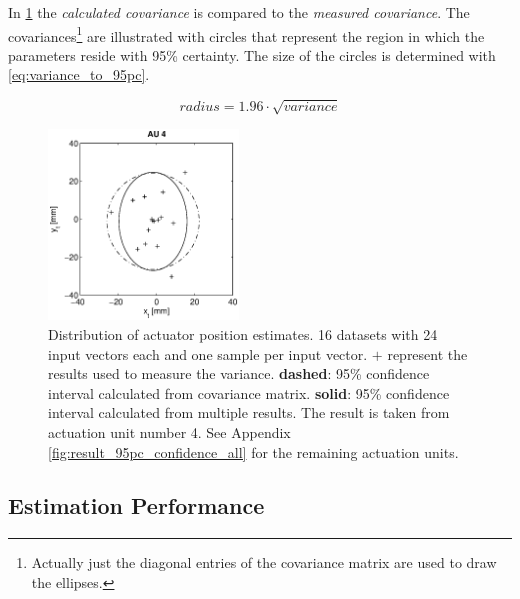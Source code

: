 In \cref{fig:result_95pc_confidence} the \textit{calculated covariance} is compared to the \textit{measured covariance}.
The covariances\footnote{
Actually just the diagonal entries of the covariance matrix are used to draw the ellipses.
}
are illustrated with circles that represent the region in which the parameters reside with 95\% certainty.
The size of the circles is determined with \cref{eq:variance_to_95pc}.

\begin{equation}
\label{eq:variance_to_95pc}
radius = 1.96 \cdot \sqrt{variance}
\end{equation}

\begin{figure}[hbtp]
\captionsetup{width=0.9\textwidth}
\centering
\includegraphics[width = 0.45\textwidth]{images/results/confidence_95_interval_AU4.eps}
\caption{Distribution of actuator position estimates. 16 datasets with 24 input vectors each and one sample per input vector.
$\mathbf{+}$ represent the results used to measure the variance.
\textbf{dashed}: 95\% confidence interval calculated from covariance matrix.
\textbf{solid}: 95\% confidence interval calculated from multiple results. The result is taken from actuation unit number 4. See Appendix \cref{fig:result_95pc_confidence_all} for the remaining actuation units.}
\label{fig:result_95pc_confidence}
\end{figure}

\subsection{Estimation Performance}
\label{sub:est_perf}

